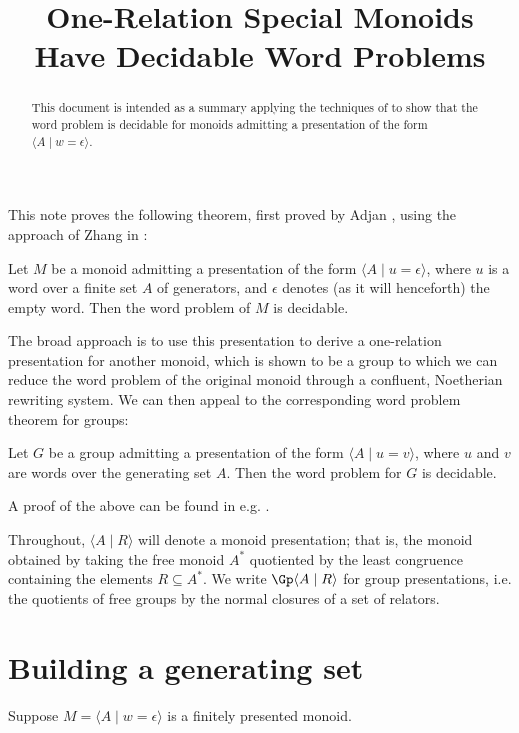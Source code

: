 \documentclass[nosubthm]{lmaths}
\title{One-Relation Special Monoids Have Decidable Word Problems}
\author{}
\date{}
\begin{document}
\maketitle

\begin{abstract}%
This document is intended as a summary applying the techniques of \cite{Zhang1992a} to show that the word problem is decidable for monoids admitting a presentation of the form $\langle A \mid w = \epsilon\rangle$.
\end{abstract}


This note proves the following theorem, first proved by Adjan \cite{Adian1966}, using the approach of Zhang in \cite{Zhang1992a}:
\begin{theorem}[Adjan] \label{thm:ors-decidablewp}
	Let $M$ be a monoid admitting a presentation of the form $\langle A \mid u = \epsilon\rangle$, where $u$ is a word over a finite set $A$ of generators, and $\epsilon$ denotes (as it will henceforth) the empty word. Then the word problem of $M$ is decidable.
\end{theorem}

The broad approach is to use this presentation to derive a one-relation presentation for another monoid, which is shown to be a group to which we can reduce the word problem of the original monoid through a confluent, Noetherian rewriting system. We can then appeal to the corresponding word problem theorem for groups:
\begin{theorem}[Magnus] \label{thm:orgp-decidablewp}
	Let $G$ be a group admitting a presentation of the form $\langle A \mid u = v\rangle$, where $u$ and $v$ are words over the generating set $A$. Then the word problem for $G$ is decidable.
\end{theorem}

A proof of the above can be found in e.g. \cite{Magnus2004}.

Throughout, $\langle A \mid R \rangle$ will denote a monoid presentation; that is, the monoid obtained by taking the free monoid $A^*$ quotiented by the least congruence containing the elements $R \subseteq A^*$. We write $\Gp \langle A \mid R \rangle$ for group presentations, i.e. the quotients of free groups by the normal closures of a set of relators.


\section{Building a generating set}

Suppose $M = \langle A \mid w = \epsilon\rangle$ is a finitely presented monoid.
\end{document}
